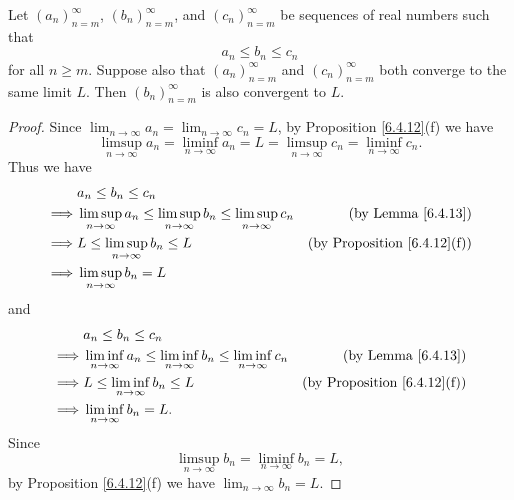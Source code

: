 \begin{corollary}\label{6.4.14}
    Let \((a_n)_{n = m}^\infty\), \((b_n)_{n = m}^\infty\), and \((c_n)_{n = m}^\infty\) be sequences of real numbers such that
    \[
        a_n \leq b_n \leq c_n
    \]
    for all \(n \geq m\).
    Suppose also that \((a_n)_{n = m}^\infty\) and \((c_n)_{n = m}^\infty\) both converge to the same limit \(L\).
    Then \((b_n)_{n = m}^\infty\) is also convergent to \(L\).
\end{corollary}

\begin{proof}
    Since \(\lim_{n \to \infty} a_n = \lim_{n \to \infty} c_n = L\), by Proposition \ref{6.4.12}(f) we have
    \[
        \limsup_{n \to \infty} a_n = \liminf_{n \to \infty} a_n = L = \limsup_{n \to \infty} c_n = \liminf_{n \to \infty} c_n.
    \]
    Thus we have
    \begin{align*}
                 & a_n \leq b_n \leq c_n                                                                                                                \\
        \implies & \limsup_{n \to \infty} a_n \leq \limsup_{n \to \infty} b_n \leq \limsup_{n \to \infty} c_n & \text{(by Lemma \ref{6.4.13})}          \\
        \implies & L \leq \limsup_{n \to \infty} b_n \leq L                                                   & \text{(by Proposition \ref{6.4.12}(f))} \\
        \implies & \limsup_{n \to \infty} b_n = L
    \end{align*}
    and
    \begin{align*}
                 & a_n \leq b_n \leq c_n                                                                                                                \\
        \implies & \liminf_{n \to \infty} a_n \leq \liminf_{n \to \infty} b_n \leq \liminf_{n \to \infty} c_n & \text{(by Lemma \ref{6.4.13})}          \\
        \implies & L \leq \liminf_{n \to \infty} b_n \leq L                                                   & \text{(by Proposition \ref{6.4.12}(f))} \\
        \implies & \liminf_{n \to \infty} b_n = L.
    \end{align*}
    Since
    \[
        \limsup_{n \to \infty} b_n = \liminf_{n \to \infty} b_n = L,
    \]
    by Proposition \ref{6.4.12}(f) we have \(\lim_{n \to \infty} b_n = L\).
\end{proof}


